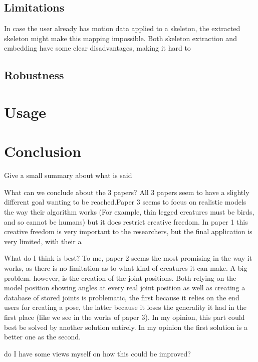 \documentclass{article}
\begin{document}

\subsection{Limitations}
In case the user already has motion data applied to a skeleton,
the extracted skeleton might make this mapping impossible.  Both skeleton
extraction and embedding have some clear disadvantages, making it hard to 
\subsection{Robustness}

\section{Usage}

\section{Conclusion}
Give a small summary about what is said

What can we conclude about the 3 papers?  All 3 papers seem to have a slightly
different goal wanting to be reached.Paper 3 seems to focus on realistic models
the way their algorithm works (For example, thin legged creatures must be birds,
and so cannot be humans) but it does restrict creative freedom. In paper 1 this
creative freedom is very important to the researchers, but the final application
is very limited, with their a

What do I think is best?
To me, paper 2 seems the most promising in the way it works, as there is no
limitation as to what kind of creatures it can make. A big problem. however, is
the creation of the joint positions. Both relying on the model position showing
angles at every real joint position as well as creating a database of stored
joints is problematic, the first because it relies on the end users for creating
a pose, the latter because it loses the generality it had in the first place
(like we see in the works of paper 3). In my opinion, this part could best be
solved by another solution entirely. In my opinion the first solution is a
better one as the second.

do I have some views myself on how this could be improved?



\end{document}
